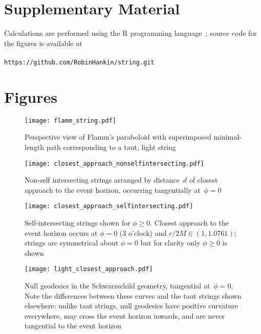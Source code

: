 
\section*{Supplementary Material}

Calculations are performed using the R programming language~\cite{rcore2018};
source code for the figures is available at
\\
\\
{\tt https://github.com/RobinHankin/string.git}


\section*{Figures}

\begin{figure}[h!] %
\centering
\texttt{[image: flamm\_string.pdf]}
\caption{Perspective view of Flamm's paraboloid with superimposed minimal-length
  path corresponding to a taut, light string}
\label{flamm}
\end{figure}

\begin{figure}[p] %
\centering
\texttt{[image: closest\_approach\_nonselfintersecting.pdf]}
\caption{Non-self intersecting strings arranged by distance~$d$ of
  closest approach to the event horizon, occurring tangentially
  at~$\phi=0$}
\label{closest_approach_non_self_intersecting}
\end{figure}

\begin{figure}[p] %
\centering
\texttt{[image: closest\_approach\_selfintersecting.pdf]}
\caption{Self-intersecting strings shown for $\phi\geq 0$.  Closest
  approach to the event horizon occurs at $\phi=0$ (3 o'clock) and
  $r/2M\in\left(1,1.0761\right)$; strings are symmetrical about $\phi=0$
  but for clarity only $\phi\geq 0$ is shown}
\label{closest_approach_self_intersecting}
\end{figure}

\begin{figure}[p] %
\centering
\texttt{[image: light\_closest\_approach.pdf]}
\caption{Null geodesics in the Schwarzschild geometry, tangential
  at~$\phi=0$.  Note the differences between these curves and the taut
  strings shown elsewhere: unlike taut strings, null geodesics have
  positive curvature everywhere, may cross the event horizon inwards,
  and are never tangential to the event horizon}
\label{light_closest_approach}
\end{figure}

